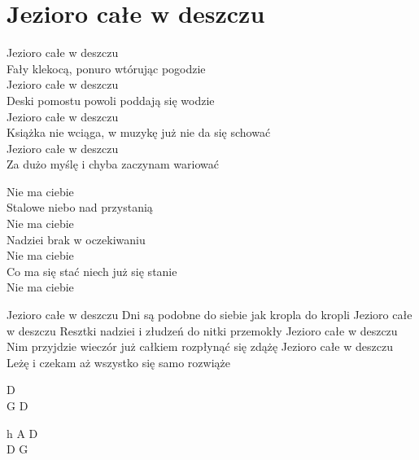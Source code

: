 \section{Jezioro całe w deszczu}
\begin{text}
Jezioro całe w deszczu\\
Fały klekocą, ponuro wtórując pogodzie\\
Jezioro całe w deszczu\\
Deski pomostu powoli poddają się wodzie\\
Jezioro całe w deszczu\\
Książka nie wciąga, w muzykę już nie da się schować\\
Jezioro całe w deszczu\\
Za dużo myślę i chyba zaczynam wariować

\vin Nie ma ciebie\\
\vin Stalowe niebo nad przystanią\\
\vin Nie ma ciebie\\
\vin Nadziei brak w oczekiwaniu\\
\vin Nie ma ciebie\\
\vin Co ma się stać niech już się stanie\\
\vin Nie ma ciebie

Jezioro całe w deszczu
Dni są podobne do siebie jak kropla do kropli
Jezioro całe w deszczu
Resztki nadziei i złudzeń do nitki przemokły
Jezioro całe w deszczu
Nim przyjdzie wieczór już całkiem rozpłynąć się zdążę
Jezioro całe w deszczu
Leżę i czekam aż wszystko się samo rozwiąże
\end{text}
\begin{chord}
    D\\
    G D

    \hfill\break
    \hfill\break
    \hfill\break
    \hfill\break
    \hfill\break
    \hfill\break
    h A D\\
    D G
\end{chord}